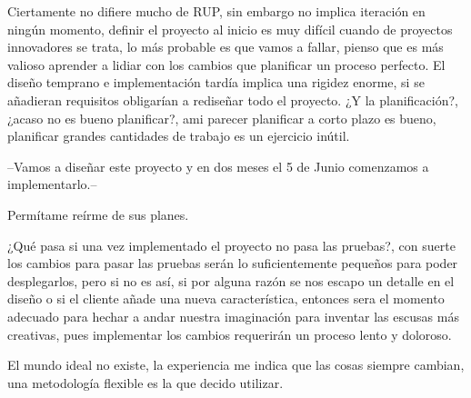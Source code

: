 Ciertamente no difiere mucho de RUP, sin embargo no implica iteración en ningún
momento, definir el proyecto al inicio es muy difícil cuando de proyectos 
innovadores se trata, lo más probable es que vamos a fallar, pienso que es más
valioso aprender a lidiar con los cambios que planificar un proceso perfecto. 
El diseño temprano e implementación tardía implica una rigidez enorme, si
se añadieran requisitos obligarían a rediseñar todo el proyecto. ¿Y la planificación?, 
¿acaso no es bueno planificar?, ami parecer planificar a corto plazo es bueno, 
planificar grandes cantidades de trabajo es un ejercicio inútil.

--Vamos a diseñar este proyecto y en dos meses el 5 de Junio comenzamos a 
implementarlo.--

Permítame reírme de sus planes.

¿Qué pasa si una vez implementado el proyecto no pasa las pruebas?, con suerte 
los cambios para pasar las pruebas serán lo suficientemente pequeños para poder
desplegarlos, pero si no es así, si por alguna razón se nos escapo un detalle
en el diseño o si el cliente añade una nueva característica, entonces sera el
momento adecuado para hechar a andar nuestra imaginación para inventar las
escusas más creativas, pues implementar los cambios requerirán un proceso 
lento y doloroso.

El mundo ideal no existe, la experiencia me indica que las cosas siempre 
cambian, una metodología flexible es la que decido utilizar.  
